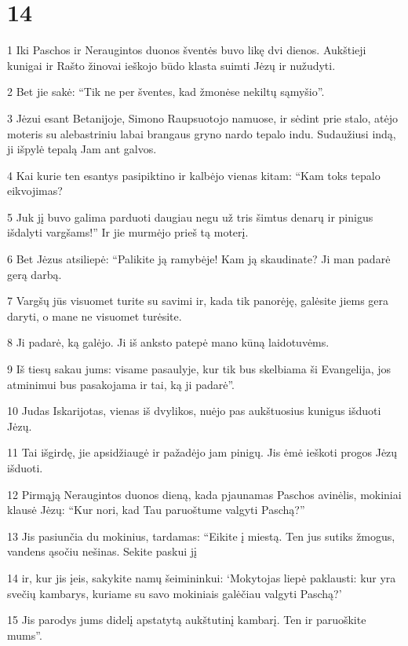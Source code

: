 \chapter{14}


\par 1 Iki Paschos ir Neraugintos duonos šventės buvo likę dvi dienos. Aukštieji kunigai ir Rašto žinovai ieškojo būdo klasta suimti Jėzų ir nužudyti. 
\par 2 Bet jie sakė: “Tik ne per šventes, kad žmonėse nekiltų sąmyšio”. 
\par 3 Jėzui esant Betanijoje, Simono Raupsuotojo namuose, ir sėdint prie stalo, atėjo moteris su alebastriniu labai brangaus gryno nardo tepalo indu. Sudaužiusi indą, ji išpylė tepalą Jam ant galvos. 
\par 4 Kai kurie ten esantys pasipiktino ir kalbėjo vienas kitam: “Kam toks tepalo eikvojimas? 
\par 5 Juk jį buvo galima parduoti daugiau negu už tris šimtus denarų ir pinigus išdalyti vargšams!” Ir jie murmėjo prieš tą moterį. 
\par 6 Bet Jėzus atsiliepė: “Palikite ją ramybėje! Kam ją skaudinate? Ji man padarė gerą darbą. 
\par 7 Vargšų jūs visuomet turite su savimi ir, kada tik panorėję, galėsite jiems gera daryti, o mane ne visuomet turėsite. 
\par 8 Ji padarė, ką galėjo. Ji iš anksto patepė mano kūną laidotuvėms. 
\par 9 Iš tiesų sakau jums: visame pasaulyje, kur tik bus skelbiama ši Evangelija, jos atminimui bus pasakojama ir tai, ką ji padarė”. 
\par 10 Judas Iskarijotas, vienas iš dvylikos, nuėjo pas aukštuosius kunigus išduoti Jėzų. 
\par 11 Tai išgirdę, jie apsidžiaugė ir pažadėjo jam pinigų. Jis ėmė ieškoti progos Jėzų išduoti. 
\par 12 Pirmąją Neraugintos duonos dieną, kada pjaunamas Paschos avinėlis, mokiniai klausė Jėzų: “Kur nori, kad Tau paruoštume valgyti Paschą?” 
\par 13 Jis pasiunčia du mokinius, tardamas: “Eikite į miestą. Ten jus sutiks žmogus, vandens ąsočiu nešinas. Sekite paskui jį 
\par 14 ir, kur jis įeis, sakykite namų šeimininkui: ‘Mokytojas liepė paklausti: kur yra svečių kambarys, kuriame su savo mokiniais galėčiau valgyti Paschą?’ 
\par 15 Jis parodys jums didelį apstatytą aukštutinį kambarį. Ten ir paruoškite mums”. 
